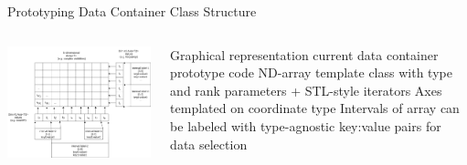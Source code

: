 \documentclass[8pt]{beamer}
\newcommand{\FIX}[1][fixme]{{\color{red}#1}}
\begin{document}
\begin{frame}{Prototyping Data Container Class Structure}

\begin{columns}[T]
  \centering
    \begin{column}{.65\textwidth}
    \centering
    \begin{minipage}{9cm}
    \includegraphics[width=\textwidth]{data-container-baseline.png}
    \end{minipage}
    \end{column}
    \hspace{0.5cm}
  \begin{column}{.2\textwidth}
  \centering
  \begin{minipage}{3cm}
  \vspace{1.5cm}
    \begin{outline}
    \1 Graphical representation current data container prototype code
    \1 ND-array template class with type and rank parameters + STL-style iterators
    \1 Axes templated on coordinate type
    \1 Intervals of array can be labeled with type-agnostic key:value pairs for
    data selection
    \end{outline}
    \end{minipage}
    \end{column}
  \end{columns}



\end{frame}
\end{document}
